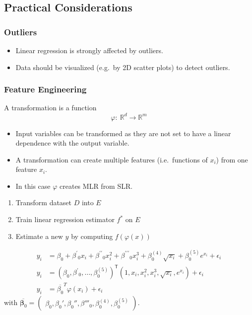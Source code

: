 \subsection{Practical Considerations}

\subsubsection{Outliers}
\begin{itemize}
    \item Linear regression is strongly affected by outliers.
    \item Data should be visualized (e.g.\ by 2D scatter plots) to detect outliers.
\end{itemize}


\subsubsection{Feature Engineering}

A transformation is a function
\begin{equation*}
    \varphi{:}\:\mathbb{R}^d\to\mathbb{R}^m
\end{equation*}

\begin{itemize}
    \item Input variables can be transformed as they are not set to have a linear dependence with the output variable.
    \item A transformation can create multiple features (i.e.\ functions of $x_i$) from one feature $x_i$.
    \item In this case $\varphi$ creates MLR from SLR.
\end{itemize}


\begin{enumerate}
    \item Transform dataset $D$ into $E$
    \item Train linear regression estimator $f^*$ on $E$
    \item Estimate a new $y$ by computing $f(\varphi(x))$
\end{enumerate}


\noindent\begin{align*}
    y_i & =\beta_0+\beta^{\prime}{}_0x_i+\beta^{\prime\prime}{}_0x_i^2+\beta^{\prime\prime\prime}{}_0x_i^3+\beta_0^{(4)}\sqrt{x_i}+\beta_0^{(5)}e^{x_i}+\epsilon_i \\
    y_i & ={\left(\beta_0,\beta^{\prime}{}_0,\dots,\beta_0^{(5)}\right)}^{\mathsf{T}}\left(1,x_i,x_i^2,x_i^3,\sqrt{x_i},e^{x_i}\right)+\epsilon_i                  \\
    y_i & =\overline{\beta_0}^T\varphi(x_i)+\epsilon_i
\end{align*}
with $\overline{\boldsymbol{\beta}_0}=\begin{pmatrix}\beta_0,\beta_0',\beta_0'',\beta'''_0,\beta_0^{(4)},\beta_0^{(5)}\end{pmatrix}$. %

